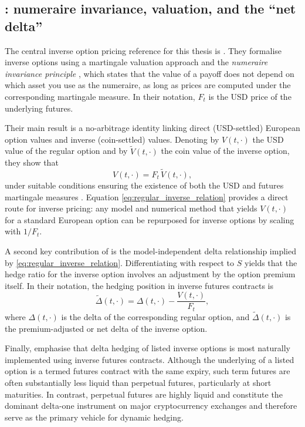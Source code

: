 \documentclass[a4paper,titlepage,12pt]{report}
\theoremstyle{plain}
\begin{document}
\subsection{\citet{LucicSepp2024}: numeraire invariance, valuation, and the ``net delta''}\label{subsec:lucic_sepp}

The central inverse option pricing reference for this thesis is \citet{LucicSepp2024}. They formalise inverse options using a martingale valuation approach
and the \emph{numeraire invariance principle} \citep{GemanElKarouiRochet1995}, which states that the value of a payoff does not depend on which asset you use as the numeraire, as long as prices are computed under the corresponding martingale measure. In their notation, $F_t$ is the
USD price of the underlying futures.

Their main result is a no-arbitrage identity linking direct (USD-settled) European option values and inverse (coin-settled) values. Denoting by $V(t,\cdot)$ the USD value of the regular option and by $\widetilde V(t,\cdot)$ the coin value of the inverse option, they show that
\begin{equation}
V(t,\cdot) = F_t\,\widetilde V(t,\cdot),
\label{eq:regular_inverse_relation}
\end{equation}
under suitable conditions ensuring the existence of both the USD and futures martingale measures \citep{LucicSepp2024}.
Equation \eqref{eq:regular_inverse_relation} provides a direct route for inverse pricing: any model and numerical method that yields $V(t,\cdot)$ for a standard European option can be repurposed for inverse options by scaling with $1/F_t$.

A second key contribution of \citet{LucicSepp2024} is the model-independent delta relationship implied
by \eqref{eq:regular_inverse_relation}. Differentiating with respect to $S$ yields that the hedge ratio
for the inverse option involves an adjustment by the option premium itself. In their notation, the
hedging position in inverse futures contracts is
\begin{equation}
\widetilde\Delta(t,\cdot)= \Delta(t,\cdot) - \frac{V(t,\cdot)}{F_t},
\label{eq:premium_adjusted_delta}
\end{equation}
where $\Delta(t,\cdot)$ is the delta of the corresponding regular option, and $\widetilde\Delta(t,\cdot)$ is the premium-adjusted or net delta of the inverse option.

Finally, \citet{LucicSepp2024} emphasise that delta hedging of listed inverse options is most naturally implemented using inverse futures contracts. Although the underlying of a listed option is a termed futures contract with the same expiry, such term futures are often substantially less liquid than perpetual futures, particularly at short maturities. In contrast, perpetual futures are highly liquid and constitute the dominant delta-one instrument on major cryptocurrency exchanges and therefore serve as the primary vehicle for dynamic hedging.
\end{document}
